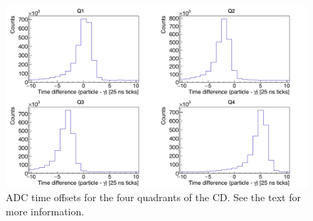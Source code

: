 \documentclass[twoside,english]{uiofysmaster/uiofysmaster}
\begin{document}
\begin{figure}[ht]
	\centering
	\includegraphics[width=\textwidth]{../Plots/plotting/tdiff_gp_0-3-user.png}
	\caption{ADC time offsets for the four quadrants of the CD. 
	See the text for more information.}
	\label{fig:ADC_dt}
\end{figure}



\end{document}
